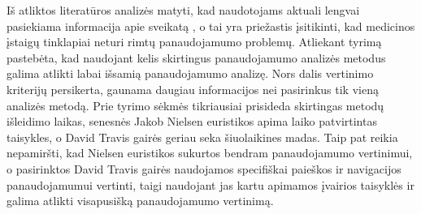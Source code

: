 \documentclass{VUMIFPSkursinis}
\begin{document}
Iš atliktos literatūros analizės matyti, kad naudotojams aktuali lengvai pasiekiama informacija apie sveikatą \cite{EmergingmHealthEn}\cite{InternetUseByPublicHKEn}, o tai yra priežastis įsitikinti, kad medicinos įstaigų tinklapiai neturi rimtų panaudojamumo problemų. Atliekant tyrimą pastebėta, kad naudojant kelis skirtingus panaudojamumo analizės metodus galima atlikti labai išsamią panaudojamumo analizę. Nors dalis vertinimo kriterijų persikerta, gaunama daugiau informacijos nei pasirinkus tik vieną analizės metodą. Prie tyrimo sėkmės tikriausiai prisideda skirtingas metodų išleidimo laikas, senesnės Jakob Nielsen euristikos apima laiko patvirtintas taisykles, o David Travis gairės geriau seka šiuolaikines madas. Taip pat reikia nepamiršti, kad Nielsen euristikos sukurtos bendram panaudojamumo vertinimui, o pasirinktos David Travis gairės naudojamos specifiškai paieškos ir navigacijos panaudojamumui vertinti, taigi naudojant jas kartu apimamos įvairios taisyklės ir galima atlikti visapusišką panaudojamumo vertinimą.


\printbibliography[heading=bibintoc, title=Šaltiniai]  %


\end{document}
